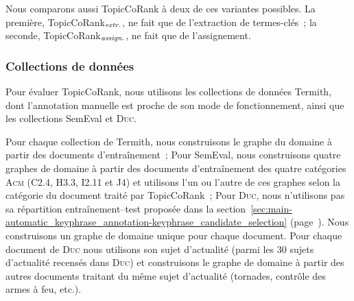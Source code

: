         Nous comparons aussi TopicCoRank à deux de ces variantes possibles. La
        première, TopicCoRank$_\textnormal{\textit{extr.}}$, ne fait que de
        l'extraction de termes-clés~; la seconde,
        TopicCoRank$_\textnormal{\textit{assign.}}$, ne fait que de
        l'assignement.

      \subsubsection{Collections de données}
      \label{subsubsec:main-automatic_keyphrase_annotation-supervised_automatic_keyphrase_annotation-evaluation-evaluation_data}
        Pour évaluer TopicCoRank, nous utilisons les collections de données
        Termith, dont l'annotation manuelle est proche de son mode de
        fonctionnement, ainsi que les collections SemEval et \textsc{Duc}.
        
        Pour chaque collection de Termith, nous construisons le graphe du
        domaine à partir des documents d'entraînement~; Pour SemEval, nous
        construisons quatre graphes de domaine à partir des documents
        d'entraînement des quatre catégories \textsc{Acm} (C2.4, H3.3, I2.11 et
        J4) et utilisons l'un ou l'autre de ces graphes selon la catégorie du
        document traité par TopicCoRank~; Pour \textsc{Duc}, nous n'utilisons
        pas sa répartition entraînement--test proposée dans la
        section~\ref{sec:main-automatic_keyphrase_annotation-keyphrase_candidate_selection}
        (page~\pageref{sec:main-automatic_keyphrase_annotation-keyphrase_candidate_selection}).
        Nous construisons un graphe de domaine unique pour chaque document. Pour
        chaque document de \textsc{Duc} nous utilisons son sujet d'actualité
        (parmi les 30 sujets d'actualité recensés dans \textsc{Duc}) et
        construisons le graphe de domaine à partir des autres documents traitant
        du même sujet d'actualité (tornades, contrôle des armes à feu, etc.).

